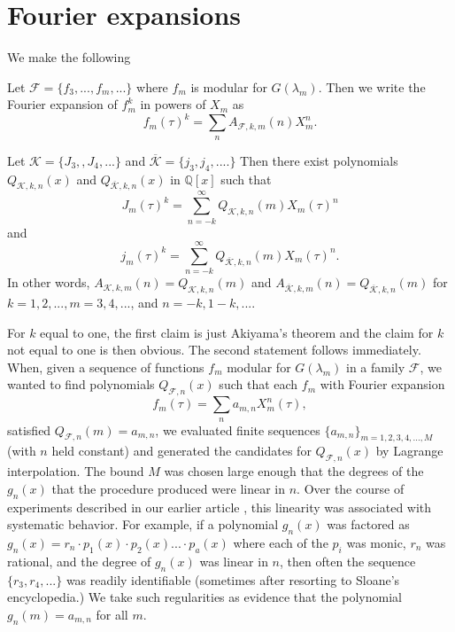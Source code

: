 \documentclass{article}
\begin{document}
 \section{Fourier expansions}
 \noindent
 We make the following 
 \begin{definition}
 Let $\mathcal{F} = \{f_3, ..., f_m, ...\}$
 where $f_m$ is modular for $G(\lambda_m)$.
 Then we write the Fourier expansion
 of $f_m^k$ in powers of $X_m$ as
$$
f_m(\tau)^k = \sum_n A_{\mathcal{F},k,m}(n)X_m^n.
$$
 \end{definition} \noindent
\begin{proposition}
Let 
$\mathcal{K} =
\{J_3, , J_4,...\}$
and $\overline{\mathcal{K}} =
\{j_3, j_4,....\}$
Then there exist polynomials
$Q_{\mathcal{K},k,n}(x)$ and
$Q_{\overline{\mathcal{K}},k,n}(x)$
in $\mathbb{Q}[x]$
such that 
$$J_m(\tau)^k = 
\sum_{n = -k}^{\infty} 
Q_{\mathcal{K},k,n}(m) X_m(\tau)^n$$ and
$$j_m(\tau)^k = 
\sum_{n = -k}^{\infty} 
Q_{\overline{\mathcal{K}},k,n}(m) 
X_m(\tau)^n.$$
In other words,
$A_{\mathcal{K},k,m}(n) = Q_{\mathcal{K},k,n}(m)$
and 
$A_{\overline{\mathcal{K}},k,m}(n) = 
Q_{\overline{\mathcal{K}},k,n}(m)$
for $k = 1, 2, ..., m = 3, 4, ...$,
and $n = -k, 1-k, ....$
\end{proposition} 
\noindent
For $k$ equal to one, 
the first claim is
just Akiyama's theorem and
the claim for $k$ not equal to
one is then obvious.
The second statement 
follows immediately.
\newline \newline \noindent
When, given  a sequence of functions
$f_m$ modular for  $G(\lambda_m)$ 
in a family $\mathcal{F}$,
we wanted to find polynomials
$Q_{\mathcal{F},n}(x)$
such that each $f_m$
with Fourier expansion
$$
f_m(\tau) = \sum_n  a_{m,n} X_m^n(\tau),
$$
satisfied $Q_{\mathcal{F},n}(m) = a_{m,n}$,
we evaluated
finite sequences
$\{a_{m,n}\}_{m = 1, 2, 3, 4, ...,M}$
 (with $n$ held constant)
and generated the candidates
for $Q_{\mathcal{F},n}(x)$
by Lagrange interpolation.
The bound $M$ was 
chosen large enough that
the degrees of the $g_n(x)$
that the procedure produced were
linear in $n$.
Over the
course of experiments described in
our earlier article \cite{interpolating}, 
this linearity 
was associated with systematic behavior.
For example, if a polynomial $g_n(x)$
was factored as 
$g_n(x) = 
r_n\cdot p_1(x) \cdot p_2(x)...\cdot p_a(x)$
where each of the $p_i$ was monic, $r_n$
was rational, and the degree of $g_n(x)$
was linear in $n$, then often the sequence
$\{r_3, r_4, ...\}$ was readily identifiable
(sometimes after resorting to Sloane's
encyclopedia.) We take such regularities
as evidence that the polynomial $g_n(m) =
a_{m,n}$ for all $m$.
\end{document}
